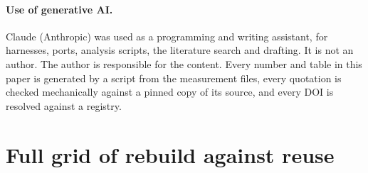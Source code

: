 \documentclass[11pt]{article}
\begin{document}
\paragraph{Use of generative AI.} Claude (Anthropic) was used as a programming and writing assistant, for harnesses, ports, analysis scripts, the literature search and drafting. It is not an author. The author is responsible for the content. Every number and table in this paper is generated by a script from the measurement files, every quotation is checked mechanically against a pinned copy of its source, and every DOI is resolved against a registry.

\appendix
\section{Full grid of rebuild against reuse}
\label{app:grid}

\begin{table}[H]
\centering
\scriptsize

\caption{Nanoseconds per trace entry, median across processes, for each cell of the grid. Column names as in Table~\ref{tab:cross}.}
\label{tab:crossfull}
\end{table}


\end{document}
